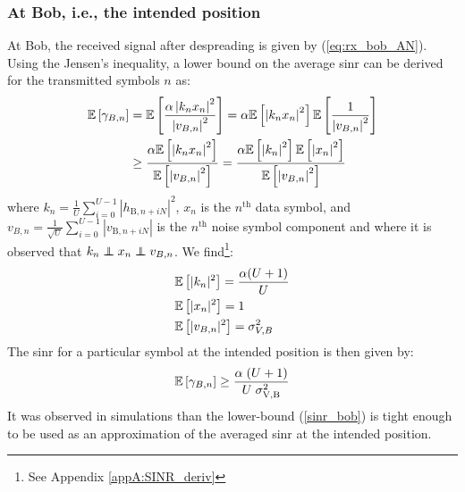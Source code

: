 \subsubsection{At Bob, i.e., the intended position}
At Bob, the received signal after despreading is given by (\ref{eq:rx_bob_AN}). Using the Jensen's inequality, a lower bound on the average \gls{sinr} can be derived for the transmitted symbols $n$ as:
\begin{equation}
\begin{split}
    \mathbb{E} \left[\gamma_{B,n}\right] &= \mathbb{E} \left[ \frac{  \alpha \left| k_n x_n \right|^2  }{  \left| v_{B,n} \right|^2} \right]  = \alpha \mathbb{E} \left[\left| k_n  x_n\right|^2\right]  \mathbb{E} \left[\frac{1}{\left| v_{B,n} \right|^2}\right]  \\
    & \geq  \frac{\alpha \mathbb{E} \left[  \left| k_n  x_n\right|^2 \right] }{\mathbb{E} \left[ \left| v_{B,n} \right|^2 \right]} =  \frac{\alpha \mathbb{E} \left[ \left| k_n \right|^2 \right] \mathbb{E} \left[ \left| x_n \right|^2 \right] }{\mathbb{E} \left[ \left| v_{B,n} \right|^2 \right]}
    \label{eq:RV_sinr_b}
\end{split}
\end{equation}
where $k_n = \frac{1}{U}\sum_{i=0}^{U-1} \left| h_{\text{B}, n + iN}\right|^2$, $x_n$ is the $n^{\text{th}}$ data symbol, and $v_{B,n} = \frac{1}{\sqrt{U}}\sum_{i=0}^{U-1} \left| v_{\text{B}, n + iN}\right|$ is the $n^{\text{th}}$ noise symbol component and where it is observed that $k_n \independent x_n \independent v_{B,n}$.
We find\footnote{See Appendix \ref{appA:SINR_deriv}}:
\begin{equation}
    \begin{split}
        &\mathbb{E} \left[|k_n|^2\right] = \frac{\alpha(U+1)}{U} \\
        &\mathbb{E} \left[|x_n|^2\right] = 1\\
        &\mathbb{E} \left[|v_{B,n}|^2\right] = \sigma^2_{V,B}
    \end{split}
    \label{eq:expected_bob}
\end{equation}
The \gls{sinr} for a particular symbol at the intended position is then given by:
\begin{equation}
    \mathbb{E} \left[\gamma_{B,n}\right] \geq \frac{\alpha \;(U+1)}{U \; \sigma_{\text{V,B}}^2}
    \label{sinr_bob}
\end{equation}
It was observed in simulations than the lower-bound (\ref{sinr_bob}) is tight enough to be used as an approximation of the averaged \gls{sinr} at the intended position. 





